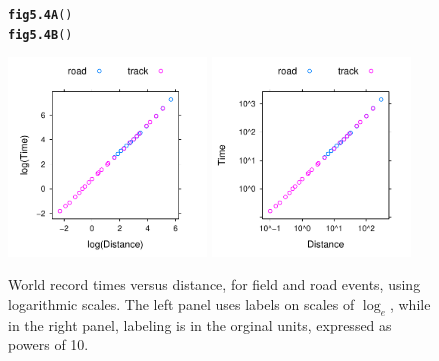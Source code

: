 \documentclass[12pt, a4paper,  BCOR=8.25mm, DIV=15]{scrartcl}\usepackage[]{graphicx}\usepackage[]{color}
\makeatletter
\newcommand{\hlstd}[1]{\textcolor[rgb]{0.345,0.345,0.345}{#1}}%
\newcommand{\hlkwd}[1]{\textcolor[rgb]{0.737,0.353,0.396}{\textbf{#1}}}%
\newenvironment{kframe}{%
 \def\at@end@of@kframe{}%
 \ifinner\ifhmode%
  \def\at@end@of@kframe{\end{minipage}}%
  \begin{minipage}{\columnwidth}%
 \fi\fi%
 \def\FrameCommand##1{\hskip\@totalleftmargin \hskip-\fboxsep
 \colorbox{shadecolor}{##1}\hskip-\fboxsep
     \hskip-\linewidth \hskip-\@totalleftmargin \hskip\columnwidth}%
 \MakeFramed {\advance\hsize-\width
   \@totalleftmargin\z@ \linewidth\hsize
   \@setminipage}}%
 {\par\unskip\endMakeFramed%
 \at@end@of@kframe}
\newenvironment{knitrout}{}{} %
\makeatother
\begin{document}
\begin{figure}
\begin{knitrout}
\color{fgcolor}\begin{kframe}
\begin{alltt}
\hlkwd{fig5.4A}\hlstd{()}
\hlkwd{fig5.4B}\hlstd{()}
\end{alltt}
\end{kframe}

{\centering \includegraphics[width=0.47\textwidth]{figs/glm-fig5_4e-1} 
\includegraphics[width=0.47\textwidth]{figs/glm-fig5_4e-2} 

}



\end{knitrout}
\caption{World record times versus distance, for field and road
  events, using logarithmic scales.  The left panel uses labels on
  scales of $\log_e$, while in the right panel, labeling is in the
  orginal units, expressed as powers of 10.}
\label{fig:wrlog}
\end{figure}
\end{document}
